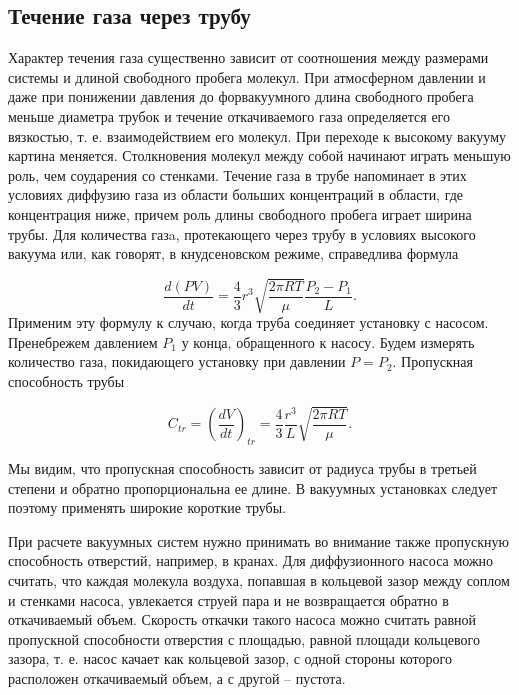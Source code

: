 \documentclass[a4paper,12pt]{article} %
\begin{document}
\subsection{Течение газа через трубу}
	Характер течения газа существенно зависит от соотношения между размерами системы и длиной свободного пробега молекул. При атмосферном давлении и даже при понижении давления до форвакуумного длина свободного пробега меньше диаметра трубок и течение откачиваемого газа определяется его вязкостью, т. е. взаимодействием его молекул. При переходе к высокому вакууму картина меняется. Столкновения молекул между собой начинают играть меньшую роль, чем соударения со стенками. Течение газа в трубе напоминает в этих условиях диффузию газа из области больших концентраций в области, где концентрация ниже, причем роль длины свободного пробега играет ширина трубы.
Для количества газa, протекающего через трубу в условиях высокого вакуума или, как говорят, в кнудсеновском режиме, справедлива формула

\begin{equation}
\label{formula}
	\frac{d(PV)}{dt}=\frac{4}{3}r^3 \sqrt{\frac{2\pi RT}{\mu}} \frac{P_2-P_1}{L}.
\end{equation}
Применим эту формулу к случаю, когда труба соединяет установку с насосом.
Пренебрежем давлением $P_1$ у конца, обращенного к насосу. Будем измерять количество газа, покидающего установку при давлении $P = P_2$. Пропускная способность трубы

\begin{equation}
	C_{tr}=(\frac{dV}{dt})_{tr}=\frac{4}{3}\frac{r^3}{L}\sqrt{\frac{2\pi RT}{\mu}}.
\end{equation}

	Мы видим, что пропускная способность зависит от радиуса трубы в третьей степени и обратно пропорциональна ее длине. В вакуумных установках следует поэтому применять широкие короткие  трубы.
	
	При расчете вакуумных систем нужно принимать во внимание также пропускную способность отверстий, например, в кранах. Для диффузионного насоса можно считать, что каждая молекула воздуха, попавшая в кольцевой зазор между соплом и стенками насоса, увлекается струей пара и не возвращается обратно в откачиваемый объем. Скорость откачки такого насоса можно считать равной пропускной способности отверстия с площадью, равной площади кольцевого зазора, т. е. насос качает как кольцевой зазор, с одной стороны которого расположен откачиваемый объем, а с другой -- пустота.
\end{document}
